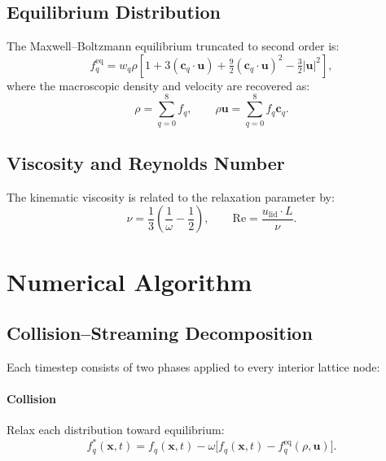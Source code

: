 \documentclass[journal]{IEEEtran}
\begin{document}
\subsection{Equilibrium Distribution}
The Maxwell--Boltzmann equilibrium truncated to second order is:
\begin{equation}
  f_q^{\mathrm{eq}} = w_q \rho \left[
    1 + 3(\mathbf{c}_q \cdot \mathbf{u})
    + \tfrac{9}{2}(\mathbf{c}_q \cdot \mathbf{u})^2
    - \tfrac{3}{2}|\mathbf{u}|^2
  \right],
  \label{eq:feq}
\end{equation}
where the macroscopic density and velocity are recovered as:
\begin{equation}
  \rho = \sum_{q=0}^{8} f_q, \qquad
  \rho\mathbf{u} = \sum_{q=0}^{8} f_q \mathbf{c}_q.
  \label{eq:macro}
\end{equation}

\subsection{Viscosity and Reynolds Number}
The kinematic viscosity is related to the relaxation parameter by:
\begin{equation}
  \nu = \frac{1}{3}\left(\frac{1}{\omega} - \frac{1}{2}\right),
  \qquad
  \mathrm{Re} = \frac{u_{\mathrm{lid}} \cdot L}{\nu}.
  \label{eq:re}
\end{equation}

\section{Numerical Algorithm}
\label{sec:algo}

\subsection{Collision--Streaming Decomposition}
Each timestep consists of two phases applied to every interior lattice
node:

\paragraph{Collision} Relax each distribution toward equilibrium:
\begin{equation}
  f_q^{*}(\mathbf{x}, t) = f_q(\mathbf{x}, t)
  - \omega\bigl[f_q(\mathbf{x}, t) - f_q^{\mathrm{eq}}(\rho, \mathbf{u})\bigr].
  \label{eq:collide}
\end{equation}
\end{document}
